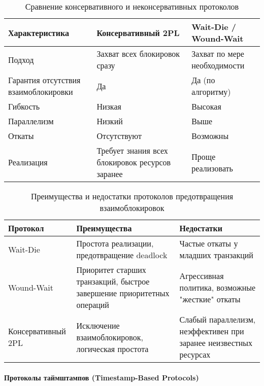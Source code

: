  \begin{table}[H]
     \centering
     \caption{Сравнение консервативного и неконсервативных протоколов}
     \begin{tabular}{|p{5cm}|p{5cm}|p{5cm}|}
         \hline
         \textbf{Характеристика} & \textbf{Консервативный 2PL} & \textbf{Wait-Die / Wound-Wait} \\
         \hline
         Подход & Захват всех блокировок сразу & Захват по мере необходимости \\
         \hline
         Гарантия отсутствия взаимоблокировки & Да & Да (по алгоритму) \\
         \hline
         Гибкость & Низкая & Высокая \\
         \hline
         Параллелизм & Низкий & Выше \\
         \hline
         Откаты & Отсутствуют & Возможны \\
         \hline
         Реализация & Требует знания всех блокировок ресурсов заранее & Проще реализовать \\
         \hline
     \end{tabular}
 \end{table}
     
 \begin{table}[H]
     \centering
     \caption{Преимущества и недостатки протоколов предотвращения взаимоблокировок}
     \begin{tabular}{|l|p{6cm}|p{6cm}|}
         \hline
         \textbf{Протокол} & \textbf{Преимущества} & \textbf{Недостатки} \\
         \hline
         Wait-Die & Простота реализации, предотвращение deadlock & Частые откаты у младших транзакций \\
         \hline
         Wound-Wait & Приоритет старших транзакций, быстрое завершение приоритетных операций & Агрессивная политика, возможные "жесткие" откаты \\
         \hline
         Консервативный 2PL & Исключение взаимоблокировок, логическая простота & Слабый параллелизм, неэффективен при заранее неизвестных ресурсах \\
         \hline
     \end{tabular}
 \end{table}
    
\paragraph{Протоколы таймштампов (Timestamp-Based Protocols)} ~\\

